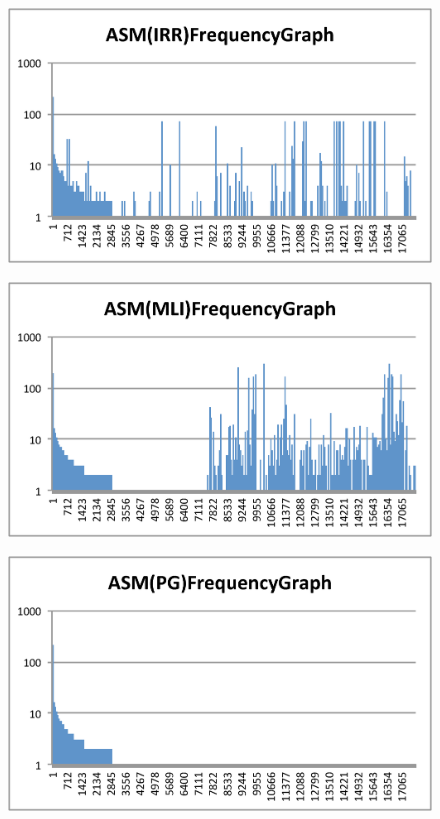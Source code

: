 \documentclass[conference]{IEEEtran}
\begin{document}
\begin{figure}[bt]
\begin{minipage}[b]{0.48\linewidth}
    \label{fig:asm-5gram-DR-histogram}%
  \end{minipage}
  \begin{minipage}[b]{0.48\linewidth}
    \includegraphics[clip,width=1.0\columnwidth]{images/IRR}%
    \label{fig:asm-5gram-IRR-histogram}%
  \end{minipage}
  \begin{minipage}[b]{0.48\linewidth}
    \includegraphics[clip,width=1.0\columnwidth]{images/MLI}%
    \label{fig:asm-5gram-MLI-histogram}%
  \end{minipage}
  \begin{minipage}[b]{0.48\linewidth}
    \includegraphics[clip,width=1.0\columnwidth]{images/PG}%

\end{minipage}
\end{figure}
\end{document}

